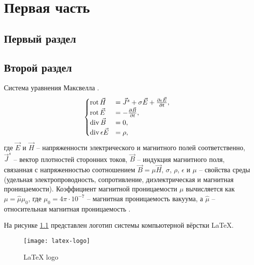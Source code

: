 
\chapter{Первая часть}

    \section{Первый раздел}    

    \lipsum[1-1]
            
    \section{Второй раздел}
        
        Система уравнения Максвелла \cite{book:griffiths1999}.
        \begin{equation}
            \label{eq:maxwell}
            \begin{cases}
                \operatorname{rot} \vec{H}                &= \vec{J}^{s} + \sigma \vec{E} +
                                                \frac{\partial \epsilon \vec{E}}{\partial t},     \\
                \operatorname{rot} \vec{E}                &= -\frac{\partial \vec{B}}{\partial t},             \\ 
                \operatorname{div} \vec{B}          &= 0,                                 \\
                \operatorname{div} \epsilon \vec{E} &= \rho,                                            
            \end{cases}
        \end{equation}
        где $\vec{E}$ и $\vec{H}$ -- напряженности электрического и магнитного полей
        соответственно, $\vec{J}^{s}$ -- вектор плотностей сторонних токов,
        $\vec{B}$ -- индукция магнитного поля, связанная с напряженностью соотношением
        $\vec{B} = \mu \vec{H}$, $\sigma$, $\rho$, $\epsilon$ и $\mu$ -- свойства среды
        (удельная электропроводность, сопротивление, диэлектрическая и магнитная проницаемости).
        Коэффициент магнитной проницаемости $\mu$ вычисляется как $\mu = \hat{\mu} \mu_0$, где
        $\mu_0 = 4 \pi \cdot 10^{-7}$ -- магнитная проницаемость вакуума,
        а $\hat{\mu}$ -- относительная магнитная проницаемость \cite{book:tikhonov1986, article:persova2011}.
    
    \lipsum[1-2] 
    
    На рисунке \ref{img:latex-logo} представлен логотип системы компьютерной вёрстки \LaTeX{}.
    
    \begin{figure}
        \centering
        \texttt{[image: latex-logo]}
        \caption{\LaTeX{} logo}
        \label{img:latex-logo}
    \end{figure}
    
    \lipsum[1-10]
    

